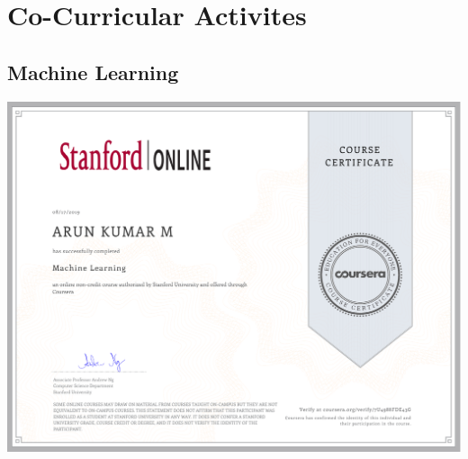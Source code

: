 \documentclass{article}
\begin{document}
\section{Co-Curricular Activites}
	\subsection{Machine Learning}
		\includegraphics[page=1, scale=0.5]{proofs/ML_certificate.pdf}\\
\end{document}
